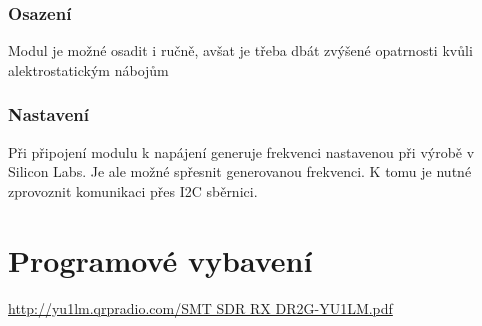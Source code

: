 \documentclass[12pt,a4paper,twoside]{article}
\begin{document}
\subsubsection{Osazení}

Modul je možné osadit i ručně, avšat je třeba dbát zvýšené opatrnosti kvůli alektrostatickým nábojům

\subsubsection{Nastavení}
Při připojení modulu k napájení generuje frekvenci nastavenou při výrobě v Silicon Labs. Je ale možné spřesnit generovanou frekvenci. K tomu je nutné zprovoznit komunikaci přes I2C sběrnici. 

\section{Programové vybavení}


\begin{thebibliography}{99}
\href{http://yu1lm.qrpradio.com/SMT SDR RX DR2G-YU1LM.pdf}{http://yu1lm.qrpradio.com/SMT SDR RX DR2G-YU1LM.pdf}

\end{thebibliography}
\end{document}
